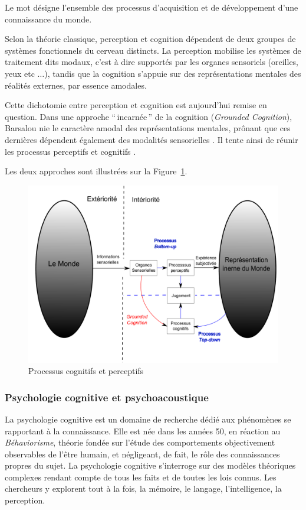 {Le mot désigne l'ensemble des processus d'acquisition et de développement d'une connaissance du monde. 

Selon la théorie classique, perception et cognition dépendent de deux groupes de systèmes fonctionnels du cerveau distincts. La perception mobilise les systèmes de traitement dits modaux, c'est à dire supportés par les organes sensoriels (oreilles, yeux etc $\ldots$), tandis que la cognition s'appuie sur des représentations mentales des réalités externes, par essence amodales.
 
Cette dichotomie entre perception et cognition est aujourd'hui remise en question. Dans une approche ``\,incarnée\,'' de la cognition (\emph{Grounded Cognition}), Barsalou nie le caractère amodal des représentations mentales, prônant que ces dernières dépendent également des modalités sensorielles \citep{barsalou2010grounded}. Il tente ainsi de réunir les processus perceptifs et cognitifs \citep{goldstone1998reuniting, barsalou1999perceptions}.

Les deux approches sont illustrées sur la Figure~\ref{fig:processusPercepAndCo}.

\begin{figure}[t]
        \myfloatalign
        \includegraphics[width=.8\linewidth]{gfx/ch_3/Representation}
        \caption{Processus cognitifs et perceptifs}\label{fig:processusPercepAndCo}
\end{figure}

\subsubsection{Psychologie cognitive et psychoacoustique}

La psychologie cognitive est un domaine de recherche dédié aux phénomènes se rapportant à la connaissance. Elle est née dans les années 50, en réaction au \emph{Béhaviorisme}, théorie fondée sur l'étude des comportements objectivement observables de l'être humain, et négligeant, de fait, le rôle des connaissances propres du sujet. La psychologie cognitive s'interroge sur des modèles théoriques complexes rendant compte de tous les faits et de toutes les lois connus. Les chercheurs y explorent tout à la fois, la mémoire, le langage, l'intelligence, la perception.
 
}
